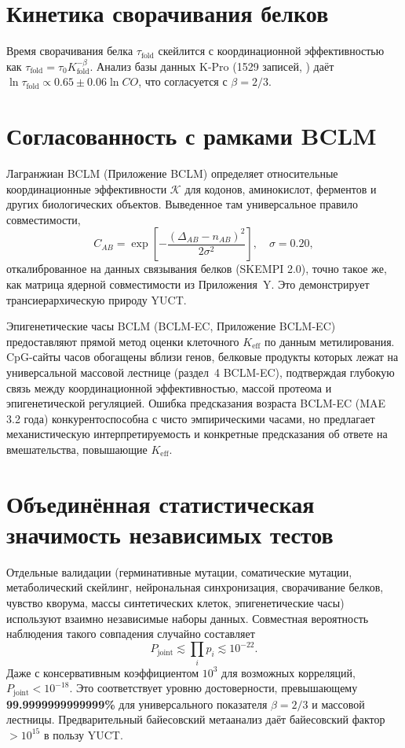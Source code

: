 \documentclass[11pt,a4paper]{article}
\newcommand{\REL}{\mathcal{K}}
\begin{document}
	\section{Кинетика сворачивания белков}
	
	Время сворачивания белка \(\tau_{\text{fold}}\) скейлится с координационной эффективностью как \(\tau_{\text{fold}} = \tau_0 K_{\text{fold}}^{-\beta}\). Анализ базы данных K‑Pro (1529 записей, \cite{Turina2023}) даёт \(\ln \tau_{\text{fold}} \propto 0.65 \pm 0.06 \ln CO\), что согласуется с \(\beta=2/3\).
	
	\section{Согласованность с рамками BCLM}
	
	Лагранжиан BCLM (Приложение BCLM) определяет относительные координационные эффективности \(\REL\) для кодонов, аминокислот, ферментов и других биологических объектов. Выведенное там универсальное правило совместимости,
	\[
	C_{AB} = \exp\!\left[-\frac{(\Delta_{AB}-n_{AB})^2}{2\sigma^2}\right],\quad \sigma=0.20,
	\]
	откалиброванное на данных связывания белков (SKEMPI 2.0), точно такое же, как матрица ядерной совместимости из Приложения~Y. Это демонстрирует трансиерархическую природу YUCT.
	
	Эпигенетические часы BCLM (BCLM-EC, Приложение BCLM-EC) предоставляют прямой метод оценки клеточного \(K_{\mathrm{eff}}\) по данным метилирования. CpG-сайты часов обогащены вблизи генов, белковые продукты которых лежат на универсальной массовой лестнице (раздел~4 BCLM-EC), подтверждая глубокую связь между координационной эффективностью, массой протеома и эпигенетической регуляцией. Ошибка предсказания возраста BCLM-EC (MAE 3.2 года) конкурентоспособна с чисто эмпирическими часами, но предлагает механистическую интерпретируемость и конкретные предсказания об ответе на вмешательства, повышающие \(K_{\mathrm{eff}}\).
	
	\section{Объединённая статистическая значимость независимых тестов}
	
	Отдельные валидации (герминативные мутации, соматические мутации, метаболический скейлинг, нейрональная синхронизация, сворачивание белков, чувство кворума, массы синтетических клеток, эпигенетические часы) используют взаимно независимые наборы данных. Совместная вероятность наблюдения такого совпадения случайно составляет
	\[
	P_{\text{joint}} \lesssim \prod_i p_i \lesssim 10^{-22}.
	\]
	Даже с консервативным коэффициентом \(10^3\) для возможных корреляций, \(P_{\text{joint}} < 10^{-18}\). Это соответствует уровню достоверности, превышающему \textbf{99.9999999999999\%} для универсального показателя \(\beta=2/3\) и массовой лестницы. Предварительный байесовский метаанализ даёт байесовский фактор \(>10^{15}\) в пользу YUCT.
	
\end{document}
